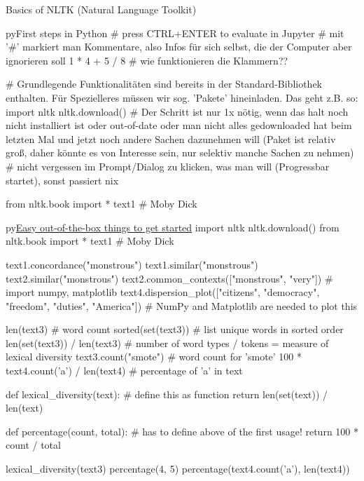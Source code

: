 \documentclass[10pt,a4paper]{article}
\begin{document}
\begin{multicols}{3}
\begin{textbox}{Basics of NLTK (Natural Language Toolkit)}
\end{textbox}


\begin{codebox}{py}{First steps in Python}
# press CTRL+ENTER to evaluate in Jupyter
# mit '#' markiert man Kommentare, also Infos für sich selbst, die der Computer aber ignorieren soll
1 * 4 + 5 / 8
# wie funktionieren die Klammern??

# Grundlegende Funktionalitäten sind bereits in der Standard-Bibliothek enthalten. Für Spezielleres müssen wir sog. 'Pakete' hineinladen. Das geht z.B. so:
import nltk 
nltk.download() # Der Schritt ist nur 1x nötig, wenn das halt noch nicht installiert ist oder out-of-date oder man nicht alles gedownloaded hat beim letzten Mal und jetzt noch andere Sachen dazunehmen will (Paket ist relativ groß, daher könnte es von Interesse sein, nur selektiv manche Sachen zu nehmen)
# nicht vergessen im Prompt/Dialog zu klicken, was man will (Progressbar startet), sonst passiert nix

from nltk.book import *
text1 # Moby Dick
\end{codebox}

\begin{codebox}{py}{\href{https://www.nltk.org/book/ch01.html}{Easy out-of-the-box things to get started}}
import nltk
nltk.download()
from nltk.book import *
text1 # Moby Dick

text1.concordance("monstrous")
text1.similar("monstrous")
text2.similar("monstrous")
text2.common_contexts(["monstrous", "very"])
# import numpy, matplotlib
text4.dispersion_plot(["citizens", "democracy", "freedom", "duties", "America"])
# NumPy and Matplotlib are needed to plot this

len(text3) # word count
sorted(set(text3)) # list unique words in sorted order
len(set(text3)) / len(text3) # number of word types / tokens = measure of lexical diversity
text3.count("smote") # word count for 'smote'
100 * text4.count('a') / len(text4) # percentage of 'a' in text

def lexical_diversity(text): # define this as function
    return len(set(text)) / len(text)
    
def percentage(count, total): # has to define above of the first usage!
    return 100 * count / total

lexical_diversity(text3)
percentage(4, 5)
percentage(text4.count('a'), len(text4))
\end{codebox}


\end{multicols}
\end{document}
